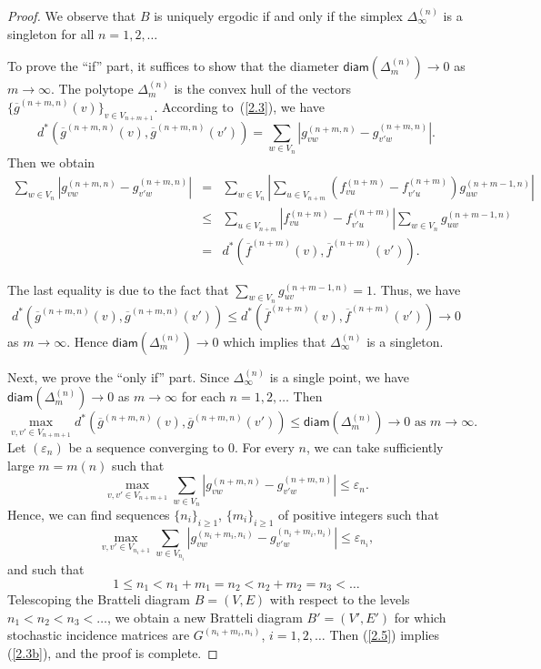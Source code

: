 \documentclass[11pt, english, reqno]{amsart}
\theoremstyle{definition}
\theoremstyle{remark}
\theoremstyle{plain}
\def\ov{\overline}
\numberwithin{equation}{section}
\begin{document}
\begin{proof}
We observe that $B$ is uniquely ergodic if and only if the simplex
$\Delta_{\infty}^{(n)}$ is a singleton for all $n = 1,2,\ldots$

To prove the ``if'' part, it suffices to show that the diameter
$\mathsf{diam}(\Delta_m^{(n)}) \to 0$ 
 as $m \to \infty$.  The polytope $\Delta_m^{(n)}$ is the convex
hull of the vectors $\{\ov g^{(n+m,n)}(v)\}_{v \in V_{n+m+1}}$.
According to~(\ref{2.3}), we have
$$
d^*(\ov g^{(n+m,n)}(v), \ov g^{(n+m,n)}(v')) = \sum_{w \in V_n}
\left|g_{vw}^{(n+m,n)} - g_{v'w}^{(n+m,n)}\right|.
$$
Then we obtain
\begin{eqnarray*}
\sum_{w \in V_n}\left|g_{vw}^{(n+m,n)} - g_{v'w}^{(n+m,n)}\right| &=&
\sum_{w \in V_n}\left|\sum_{u \in V_{n+m}} (f_{vu}^{(n+m)} - f_{v'u}^{(n
+m)})g_{uw}^{(n+m-1,n)}\right|\\
&\leq&  \sum_{u \in V_{n+m}} \left|f_{vu}^{(n+m)} - f_{v'u}^{(n+m)}\right|
\sum_{w \in V_n} g_{uw}^{(n+m-1,n)}\\
&=& d^*(\ov f^{(n+m)}(v),\ov f^{(n+m)}(v')).
\end{eqnarray*}

The last equality is due to the fact that $\sum_{w \in V_n}
g_{uv}^{(n+m-1,n)} = 1$.
Thus, we have
$$
d^*(\ov g^{(n+m,n)}(v), \ov g^{(n+m,n)}(v')) \leq d^*(\ov f^{(n+m)}(v),
\ov f^{(n+m)}(v')) \rightarrow 0
$$
as $m \rightarrow \infty$. Hence $\mathsf{diam}(\Delta_m^{(n)})
\rightarrow 0$ which implies that $\Delta^{(n)}_{\infty}$ is a singleton.

Next,  we prove the ``only if'' part. Since $\Delta^{(n)}_{\infty}$ is a single
point, we have
 $\mathsf{diam}(\Delta_m^{(n)}) \rightarrow 0$ as $m \rightarrow \infty$
 for each $n = 1,2,\ldots$  Then
$$
\max_{v,v' \in V_{n+m+1}} d^{*}(\ov g^{(n+m,n)}(v), \ov g^{(n+m,n)}(v')) \leq \mathsf{diam}
(\Delta_m^{(n)}) \rightarrow 0 \mbox{ as } m \rightarrow \infty.
$$
Let $(\varepsilon_n)$ be a sequence converging to $0$. For every $n$,
we can take sufficiently large $m = m(n)$ such that
\begin{equation*}
\max_{v,v' \in V_{n+m+1}} \sum_{w \in V_n}\left|g_{vw}^{(n+m,n)} -
g_{v'w}^{(n+m,n)}\right| \leq \varepsilon_{n}.
\end{equation*}
Hence, we can find sequences $\{n_i\}_{i \geq 1}$,
$\{m_i\}_{i \geq 1}$ of positive integers such that
\begin{equation}\label{2.5}
\max_{v, v' \in V_{n_i+1}} \sum_{w \in V_{n_i}}\left|g_{vw}^{({n_i}+m_i,
{n_i})} - g_{v'w}^{({n_i}+m_i,{n_i})}\right| \leq \varepsilon_{n_i},
\end{equation}
and such that
$$
1 \leq n_1 < n_1 + m_1 = n_2 < n_2 + m_2 = n_3 < \ldots
$$
Telescoping the Bratteli diagram $B = (V,E)$ with respect to the levels $n_1
< n_2 < n_3 < \ldots$,
 we obtain a new Bratteli diagram $B' = (V',E')$ for which stochastic incidence matrices
 are  $G^{(n_i + m_i, n_i)}$, $i = 1,2,\ldots$ Then (\ref{2.5}) implies
 (\ref{2.3b}), and the proof is complete.
\end{proof}
\end{document}
